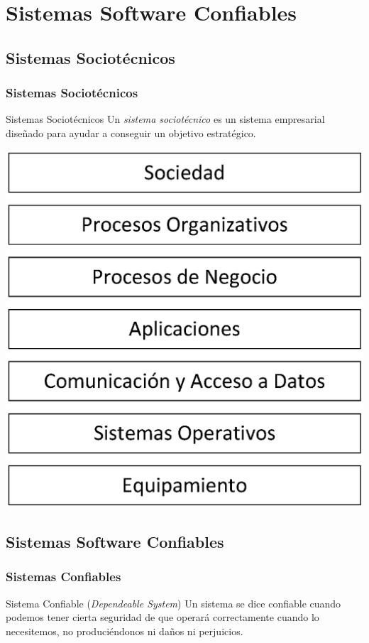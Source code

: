 \documentclass[a4paper,slidestop,xcolor=pst,dvips,blue]{beamer}
\begin{document}
\section{Sistemas Software Confiables}

\subsection{Sistemas Sociotécnicos}

\begin{frame}[c]
    \frametitle{Sistemas Sociotécnicos}
    \begin{block}{Sistemas Sociotécnicos}
        Un \emph{sistema sociotécnico} es un sistema empresarial diseñado para ayudar a conseguir un objetivo estratégico.
    \end{block}
    \begin{center}
        \includegraphics[width=0.40\linewidth]{images/sociotecnicos/layers.eps}
    \end{center}
\end{frame}

\subsection{Sistemas Software Confiables}

\begin{frame}[c]
    \frametitle{Sistemas Confiables}
    \begin{block}{Sistema Confiable (\emph{Dependeable System})}
        Un sistema se dice confiable cuando podemos tener cierta seguridad de que operará correctamente cuando lo necesitemos, no produciéndonos ni daños ni perjuicios. 
    \end{block}
\end{frame}
\end{document}
